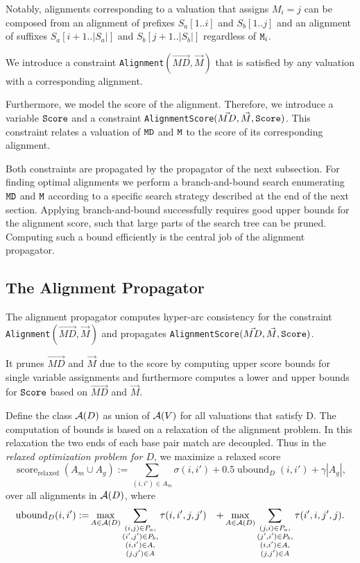 \documentclass[11pt]{llncs}
\newcommand{\score}{\operatorname{score}}
\begin{document}
Notably, alignments corresponding to a valuation that assigns $M_i=j$
can be composed from an alignment of prefixes $S_a[1..i]$ and
$S_b[1..j]$ and an alignment of suffixes $S_a[i+1..|S_a|]$ and $S_b[j+1..|S_b|]$
regardless of $\texttt{M}_i$.

We introduce a constraint \texttt{Alignment}$(\vec{MD},\vec{M})$ that is
satisfied by any valuation with a corresponding alignment.  

Furthermore, we model the score of the
alignment. Therefore, we introduce a variable $\texttt{Score}$ and a
constraint
\texttt{AlignmentScore}$(\vec{MD},\vec{M},\texttt{Score})$. This
constraint relates a valuation of $\texttt{MD}$ and $\texttt{M}$ to the
score of its corresponding alignment.

Both constraints are propagated by the propagator of the next
subsection. For finding optimal alignments we perform a
branch-and-bound search enumerating $\texttt{MD}$ and $\texttt{M}$ according
to a specific search strategy described at the end of the next
section. Applying branch-and-bound successfully requires good upper
bounds for the alignment score, such that large parts of the search
tree can be pruned. Computing such a bound efficiently is the central
job of the alignment propagator.

\subsection{The Alignment Propagator}

The alignment propagator computes hyper-arc consistency for the constraint
\texttt{Alignment}$(\vec{MD},\vec{M})$ and propagates
\texttt{AlignmentScore}$(\vec{MD},\vec{M},\texttt{Score})$.

It prunes $\vec{MD}$ and $\vec{M}$ due to the score by computing upper
score bounds for single variable assignments and furthermore computes
a lower and upper bounds for $\texttt{Score}$ based on $\vec{MD}$ and
$\vec{M}$.

Define the class ${\mathcal A}(D)$ as union of ${\mathcal A}(V)$ for all valuations that
satisfy D. The computation of bounds is based on a relaxation of the
alignment problem. In this relaxation the two ends of each base pair
match are decoupled. Thus in the \emph{relaxed optimization problem
  for $D$}, we maximize a relaxed score
 \begin{displaymath}
  \score_\text{relaxed}(A_m\cup A_g) :=
  \sum_{(i,i')\in A_m} 
  \sigma(i,i') + 0.5\operatorname{ubound}_D(i,i')
  + \gamma |A_g|,
\end{displaymath}
over all alignments in ${\mathcal A}(D)$, where
\begin{align*}
  \operatorname{ubound}_D(i,i') := & \max_{A\in{\mathcal A}(D)} \sum_{\substack{(i,j)\in P_a,\\(i',j')\in P_b,\\(i,i')\in A,\\(j,j')\in A}} \tau(i,i',j,j')
  & + \max_{A\in{\mathcal A}(D)} \sum_{\substack{(j,i)\in P_a,\\(j',i')\in P_b,\\(i,i')\in A,\\(j,j')\in A}} \tau(i',i,j',j).
\end{align*}
\end{document}
